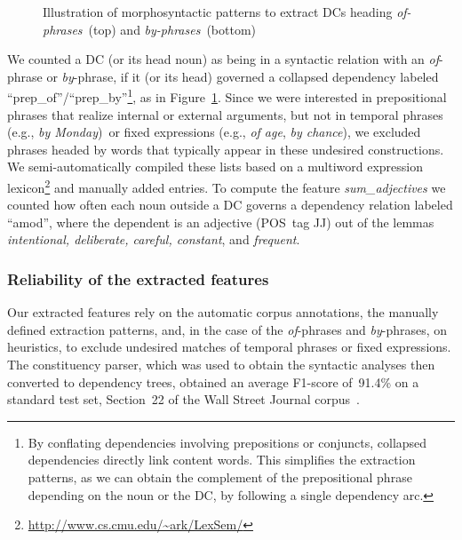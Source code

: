 \documentclass[output=paper]{langsci/langscibook}
\begin{document}
\begin{figure}[h]
   	\caption{Illustration of morphosyntactic patterns to extract DCs heading \textit{of-phrases}~(top) and \textit{by-phrases}~(bottom)}
	\label{fig:patterns-compound-phrases}
\end{figure}

We counted a DC (or its head noun) as being in a syntactic relation with an \textit{of}-phrase or \textit{by}-phrase,  if it (or its head) governed a collapsed dependency labeled ``prep\_of''/``prep\_by''\footnote{By conflating dependencies involving prepositions or conjuncts, collapsed dependencies directly link content words.
This simplifies the extraction patterns, as we can obtain the complement of the prepositional phrase depending on the noun or the DC, by following a single dependency arc.}, as in Figure~\ref{fig:patterns-compound-phrases}.
Since we were  interested in prepositional phrases that realize internal or external arguments, but not in 
temporal phrases (e.g., \textit{by Monday})~or fixed expressions (e.g., \textit{of age}, \textit{by chance}), we excluded phrases headed by words that typically appear in these undesired constructions. We semi-automatically compiled these lists based on a multiword expression lexicon\footnote{\url{http://www.cs.cmu.edu/~ark/LexSem/}} and manually added entries. To compute the feature \textit{sum\_adjectives} we counted how often each noun outside a DC governs a dependency relation labeled ``amod'', where the dependent is an adjective (POS~tag JJ) out of the lemmas \textit{intentional, deliberate, careful, constant}, and \textit{frequent}.



\subsubsection{Reliability of the extracted features}
Our extracted features rely on the automatic corpus annotations, the manually defined extraction patterns, and, in the case of the \textit{of}-phrases and \textit{by}-phrases, on heuristics, to exclude undesired matches of temporal phrases or fixed expressions. 
The constituency parser, which was used to obtain the syntactic analyses then converted to dependency trees, obtained an average F1-score of~91.4\% on a standard test set, Section~22 of the Wall Street Journal corpus~\citep{Huang:10}.
\end{document}
